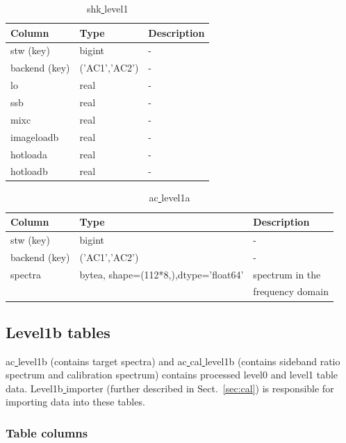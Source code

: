 \documentclass[12pt]{article}
\begin{document}
   
\begin{table}[ht]
\caption{shk\underline{ }level1}
\centering
\begin{tabular}{l l l}
\hline\hline
Column & Type & Description \\ [0.5ex]
\hline
 stw (key)       & bigint           & - \\
 backend (key)   & ('AC1','AC2')    & -\\ 
 lo         & real             & -\\ 
 ssb        & real             & -\\ 
 mixc       & real             & -\\  
 imageloadb & real             & -\\ 
 hotloada   & real             & -\\ 
 hotloadb   & real             & -\\[1ex]
\hline
\end{tabular}
\label{table:shk1}
\end{table}


\begin{table}[ht]
\caption{ac\underline{ }level1a}
\centering
\begin{tabular}{l l l}
\hline\hline
Column & Type & Description \\ [0.5ex]
\hline
stw (key)    & bigint         & - \\
backend (key) & ('AC1','AC2')  & -\\
spectra & bytea, shape=(112*8,),dtype='float64' & spectrum in the \\
& & frequency domain\\[1ex]
\hline
\end{tabular}
\label{table:ac1a}
\end{table}

\clearpage
\newpage

\subsection{Level1b tables}
ac\underline{ }level1b (contains target spectra) and
ac\underline{ }cal\underline{ }level1b (contains sideband ratio 
spectrum and calibration spectrum)
contains processed level0 and level1 table data.
Level1b\underline{ }importer (further described in
Sect.~\ref{sec:cal}) is responsible for
importing data into these tables.

\subsubsection*{Table columns}
\end{document}
